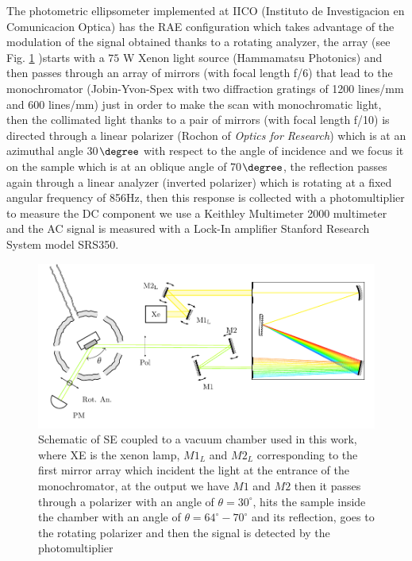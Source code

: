 The photometric ellipsometer implemented at IICO (Instituto de Investigacion en Comunicacion Optica) has the RAE configuration which takes advantage of the modulation of the signal obtained thanks to a rotating analyzer, the array (see Fig. \ref*{fig:SE-SETUP-FINE} )starts with a $75$ W Xenon light source (Hammamatsu Photonics) and then passes through an array of mirrors (with focal length f/6) that lead to the monochromator (Jobin-Yvon-Spex with two diffraction gratings of 1200 lines/mm and 600 lines/mm) just in order to make the scan with monochromatic light,  then the collimated light thanks to a pair of mirrors (with focal length f/10) is directed through a linear polarizer (Rochon of \textit{Optics for Research}) which is at an azimuthal angle 30$\degree$ with respect to the angle of incidence and we focus it on the sample which is at an oblique angle of 70$\degree$, the reflection passes again through a linear analyzer (inverted polarizer) which is rotating at a fixed angular frequency of 856Hz, then this response is collected with a photomultiplier to measure the DC component we use a Keithley Multimeter 2000 multimeter and the AC signal is measured with a Lock-In amplifier Stanford Research System model SRS350. \\


\begin{figure}[H]
	\centering
	\includegraphics[width=0.85\linewidth]{FIGURES/Characterization_techniques/SE-SETUP-FINE}
	\caption{Schematic of SE coupled to a vacuum chamber used in this work, where XE is the xenon lamp, $M1_{L}$ and $M2_{L}$ corresponding to the first mirror array which incident the light at the entrance of the monochromator, at the output we have $M1$ and $M2$ then it passes through a polarizer with an angle of $\theta=30^{\circ}$, hits the sample inside the chamber with an angle of $\theta=64^{\circ}-70^{\circ}$ and its reflection, goes to the rotating polarizer and then the signal is detected by the photomultiplier}
	\label{fig:SE-SETUP-FINE}
\end{figure}

